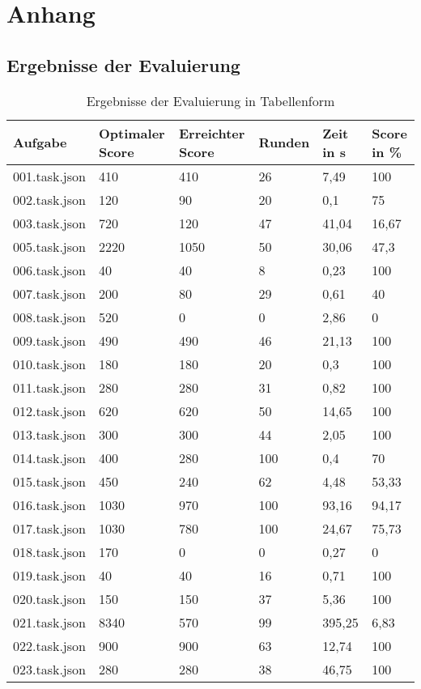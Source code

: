 \section{Anhang}

\subsection{Ergebnisse der Evaluierung}

\begin{table}
	\begin{center}
		\begin{tabular}{ | l | l | l | l | l | l |} 
\hline
\textbf{Aufgabe}&	\textbf{Optimaler Score}&	\textbf{Erreichter Score}&	\textbf{Runden}&	\textbf{Zeit in s}& \textbf{Score in \%}\\\hline		
001.task.json&	410&	410&	26&	7,49&		100\\\hline
002.task.json&	120&	90&	20&	0,1&		75\\\hline
003.task.json&	720&	120&	47&	41,04&		16,67\\\hline
005.task.json&	2220&	1050&	50&	30,06&		47,3\\\hline
006.task.json&	40&	40&	8&	0,23&		100\\\hline
007.task.json&	200&	80&	29&	0,61&		40\\\hline
008.task.json&	520&	0&	0&	2,86&		0\\\hline
009.task.json&	490&	490&	46&	21,13&		100\\\hline
010.task.json&	180&	180&	20&	0,3	&	100\\\hline
011.task.json&	280&	280&	31&	0,82&		100\\\hline
012.task.json&	620&	620&	50&	14,65&		100\\\hline
013.task.json&	300&	300&	44&	2,05&		100\\\hline
014.task.json&	400&	280&	100&	0,4&		70\\\hline
015.task.json&	450&	240&	62&	4,48&		53,33\\\hline
016.task.json&	1030&	970&	100&	93,16&		94,17\\\hline
017.task.json&	1030&	780&	100&	24,67&		75,73\\\hline
018.task.json&	170&	0&	0&	0,27&		0\\\hline
019.task.json&	40&	40&	16&	0,71&		100\\\hline
020.task.json&	150&	150&	37&	5,36&		100\\\hline
021.task.json&	8340&	570&	99&	395,25&		6,83\\\hline
022.task.json&	900&	900&	63&	12,74&		100\\\hline
023.task.json&	280&	280&	38&	46,75&		100\\\hline
\end{tabular}
\caption{Ergebnisse der Evaluierung in Tabellenform}
\end{center}
\end{table}


